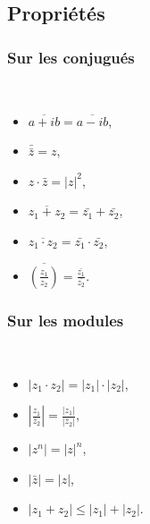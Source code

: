 \begin{fiche}
      \subsection*{Propri\'et\'es}
                  \subsubsection*{Sur les conjugu\'es} ~\\[-1.5\baselineskip]
                              \begin{itemize}
                                    \item $\overline{a+ib} = \overline{a-ib}$,
                                    \item $\bar{\bar{z}} = z$,
                                    \item $z \cdot \bar{z} = |z|^2$,
                                    \item $\overline{z_1 + z_2} = \bar{z_1} + \bar{z_2}$,
                                    \item $\overline{z_1 \cdot z_2} = \bar{z_1} \cdot \bar{z_2}$,
                                    \item $\overline{\left(\frac{z_1}{z_2}\right)} = \displaystyle{\frac{\bar{z_1}}{\bar{z_2}}}$.
                              \end{itemize}
                  \subsubsection*{Sur les modules} ~\\[-1.5\baselineskip]
                        \begin{itemize}
                              \item $|z_1 \cdot z_2| = |z_1| \cdot |z_2|$,
                              \item $\left| \frac{z_1}{z_2} \right| = \frac{|z_1|}{|z_2|}$,
                              \item $|z^n| = |z|^n$,
                              \item $|\bar{z}| = |z|$,
                              \item $|z_1 + z_2| \leq |z_1| + |z_2|$.
                        \end{itemize}

\end{fiche}
